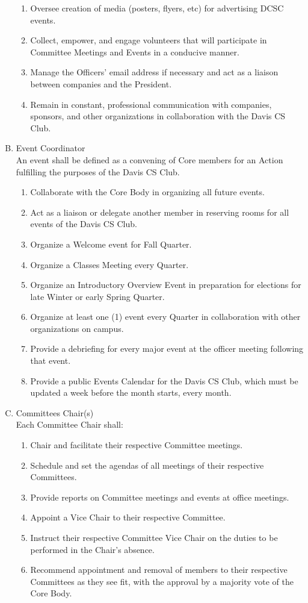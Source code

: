 \documentclass{article}
\newenvironment{li}{
\begin{enumerate}
  \setlength{\itemsep}{1pt}
  \setlength{\parskip}{0pt}
  \setlength{\parsep}{0pt}
}{\end{enumerate}}
\begin{document}
\begin{enumerate}[A.]
	\begin{li}
	\item Oversee creation of media (posters, flyers, etc) for advertising DCSC events.
	\item Collect, empower, and engage volunteers that will participate in Committee Meetings and Events in a conducive manner.
	\item Manage the Officers' email address if necessary and act as a liaison between companies and the President.
	\item Remain in constant, professional communication with companies, sponsors, and other organizations in collaboration with the Davis CS Club.
	\end{li}
\item Event Coordinator\\
An event shall be defined as a convening of Core members for an Action fulfilling the purposes of the Davis CS Club.
	\begin{li}
	\item Collaborate with the Core Body in organizing all future events.
	\item Act as a liaison or delegate another member in reserving rooms for all events of the Davis CS Club.
	\item Organize a Welcome event for Fall Quarter.
	\item Organize a Classes Meeting every Quarter.
	\item Organize an Introductory Overview Event in preparation for elections for late Winter or early Spring Quarter.
	\item Organize at least one (1) event every Quarter in collaboration with other organizations on campus.
	\item Provide a debriefing for every major event at the officer meeting following that event.
	\item Provide a public Events Calendar for the Davis CS Club, which must be updated a week before the month starts, every month.
	\end{li}
\item Committees Chair(s) \\
	Each Committee Chair shall:
	\begin{li}
	\item Chair and facilitate their respective Committee meetings.
	\item Schedule and set the agendas of all meetings of their respective Committees.
	\item Provide reports on Committee meetings and events at office meetings.
	\item Appoint a Vice Chair to their respective Committee.
	\item Instruct their respective Committee Vice Chair on the duties to be performed in the Chair's absence.
	\item Recommend appointment and removal of members to their respective Committees as they see fit, with the approval by a majority vote of the Core Body.
	\end{li}


\end{enumerate}
\end{document}
